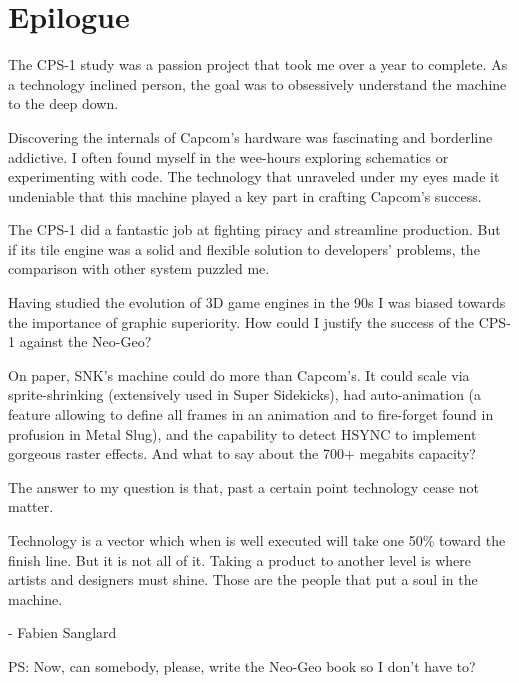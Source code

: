 \chapter{Epilogue} 

The CPS-1 study was a passion project that took me over a year to complete. As a technology inclined person, the goal was to obsessively understand the machine to the deep down.

Discovering the internals of Capcom's hardware was fascinating and borderline addictive. I often found myself in the wee-hours exploring schematics or experimenting with code. The technology that unraveled under my eyes made it undeniable that this machine played a key part in crafting Capcom's success. 

The CPS-1 did a fantastic job at fighting piracy and streamline production. But if its tile engine was a solid and flexible solution to developers' problems, the comparison with other system puzzled me.

Having studied the evolution of 3D game engines in the 90s I was biased towards the importance of graphic superiority. How could I justify the success of the CPS-1 against the Neo-Geo? 

On paper, SNK's machine could do more than Capcom's. It could scale via sprite-shrinking (extensively used in Super Sidekicks),
had auto-animation (a feature allowing to define all frames in an animation and to fire-forget found in profusion in Metal Slug), and the capability to detect HSYNC to implement gorgeous raster effects. And what to say about the 700+ megabits capacity?

The answer to my question is that, past a certain point technology cease not matter.

Technology is a vector which when is well executed will take one 50\% toward the finish line. But it is not all of it. Taking a product to another level is where artists and designers must shine. Those are the people that put a soul in the machine.

- Fabien Sanglard

PS: Now, can somebody, please, write the Neo-Geo book so I don't have to?

